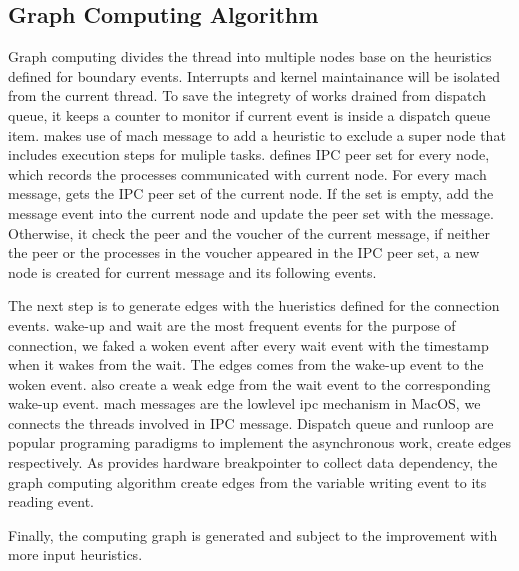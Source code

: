 \subsection{Graph Computing Algorithm}
Graph computing divides the thread into multiple nodes base on the heuristics
defined for boundary events. Interrupts and kernel maintainance will be isolated
from the current thread. To save the integrety of works drained from dispatch
queue, it keeps a counter to monitor if current event is inside a dispatch queue
item. \xxx makes use of mach message to add a heuristic to exclude a super node
that includes execution steps for muliple tasks. \xxx defines IPC peer set for
every node, which records the processes communicated with current node. For
every mach message, \xxx gets the IPC peer set of the current node. If the
set is empty, \xxx add the message event into the current node and update the
peer set with the message. Otherwise, it check the peer and the voucher of the
current message, if neither the peer or the processes in the voucher appeared in
the IPC peer set, a new node is created for current message and its following
events.

The next step is to generate edges with the hueristics defined for the
connection events. wake-up and wait are the most frequent events for the purpose
of connection, we faked a woken event after every wait event with the timestamp
when it wakes from the wait. The edges comes from the wake-up event to the woken
event. \xxx also create a weak edge from the wait event to the corresponding
wake-up event. mach messages are the lowlevel ipc mechanism in MacOS, we
connects the threads involved in IPC message. Dispatch queue and runloop are
popular programing paradigms to implement the asynchronous work, \xxx create
edges respectively. As \xxx provides hardware breakpointer to collect data
dependency, the graph computing algorithm create edges from the variable writing
event to its reading event.

Finally, the computing graph is generated and subject to the improvement with
more input heuristics.

